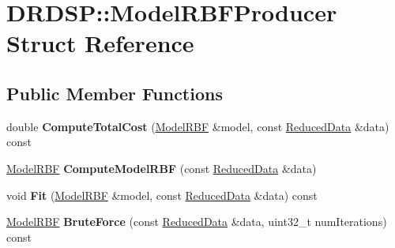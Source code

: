 \hypertarget{struct_d_r_d_s_p_1_1_model_r_b_f_producer}{\section{D\-R\-D\-S\-P\-:\-:Model\-R\-B\-F\-Producer Struct Reference}
\label{struct_d_r_d_s_p_1_1_model_r_b_f_producer}
}
\subsection*{Public Member Functions}
\begin{DoxyCompactItemize}
\item 
\hypertarget{struct_d_r_d_s_p_1_1_model_r_b_f_producer_a7d367cacba6270ef6a72432e07db8efb}{double {\bfseries Compute\-Total\-Cost} (\hyperlink{struct_d_r_d_s_p_1_1_model_r_b_f}{Model\-R\-B\-F} \&model, const \hyperlink{struct_d_r_d_s_p_1_1_reduced_data}{Reduced\-Data} \&data) const }\label{struct_d_r_d_s_p_1_1_model_r_b_f_producer_a7d367cacba6270ef6a72432e07db8efb}

\item 
\hypertarget{struct_d_r_d_s_p_1_1_model_r_b_f_producer_a400a0fee1030b359e2d4df51cebb520f}{\hyperlink{struct_d_r_d_s_p_1_1_model_r_b_f}{Model\-R\-B\-F} {\bfseries Compute\-Model\-R\-B\-F} (const \hyperlink{struct_d_r_d_s_p_1_1_reduced_data}{Reduced\-Data} \&data)}\label{struct_d_r_d_s_p_1_1_model_r_b_f_producer_a400a0fee1030b359e2d4df51cebb520f}

\item 
\hypertarget{struct_d_r_d_s_p_1_1_model_r_b_f_producer_a650ade3b485d5e9b5d2dc2a22da126fd}{void {\bfseries Fit} (\hyperlink{struct_d_r_d_s_p_1_1_model_r_b_f}{Model\-R\-B\-F} \&model, const \hyperlink{struct_d_r_d_s_p_1_1_reduced_data}{Reduced\-Data} \&data) const }\label{struct_d_r_d_s_p_1_1_model_r_b_f_producer_a650ade3b485d5e9b5d2dc2a22da126fd}

\item 
\hypertarget{struct_d_r_d_s_p_1_1_model_r_b_f_producer_af0de40c33f79ce580cc52bc510987a0e}{\hyperlink{struct_d_r_d_s_p_1_1_model_r_b_f}{Model\-R\-B\-F} {\bfseries Brute\-Force} (const \hyperlink{struct_d_r_d_s_p_1_1_reduced_data}{Reduced\-Data} \&data, uint32\-\_\-t num\-Iterations) const }\label{struct_d_r_d_s_p_1_1_model_r_b_f_producer_af0de40c33f79ce580cc52bc510987a0e}

\end{DoxyCompactItemize}
